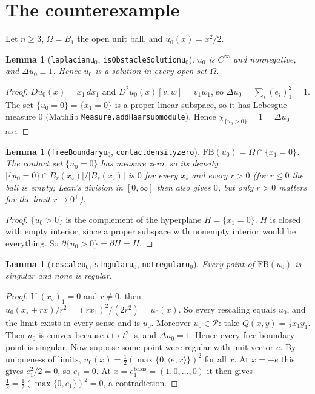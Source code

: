 \documentclass[11pt]{article}
\newtheorem{lemma}[theorem]{Lemma}
\theoremstyle{definition}
\theoremstyle{remark}
\renewcommand{\_}{\oldus\allowbreak}
\begin{document}
\section{The counterexample}

Let $n\ge 3$, $\Omega=B_1$ the open unit ball, and $u_0(x)=x_1^2/2$.

\begin{lemma}[\texttt{laplacian\_u$_0$}, \texttt{isObstacleSolution\_u$_0$}]
$u_0$ is $C^\infty$ and nonnegative, and $\Delta u_0\equiv 1$. Hence $u_0$ is a solution in every open set $\Omega$.
\end{lemma}
\begin{proof}
$Du_0(x)=x_1\,dx_1$ and $D^2u_0(x)[v,w]=v_1w_1$, so $\Delta u_0=\sum_i (e_i)_1^2=1$. The set
$\{u_0=0\}=\{x_1=0\}$ is a proper linear subspace, so it has Lebesgue measure $0$
(Mathlib \texttt{Measure.addHaar\_submodule}). Hence $\chi_{\{u_0>0\}}=1=\Delta u_0$ a.e.
\end{proof}

\begin{lemma}[\texttt{freeBoundary\_u$_0$}, \texttt{contact\_density\_zero}]
$\mathrm{FB}(u_0)=\Omega\cap\{x_1=0\}$. The contact set $\{u_0=0\}$ has measure zero, so its
density $|\{u_0=0\}\cap B_r(x_\circ)|/|B_r(x_\circ)|$ is $0$ for every $x_\circ$ and every $r>0$ (for $r\le0$ the ball is empty; Lean's division in $[0,\infty]$ then also gives $0$, but only $r>0$ matters for the limit $r\to0^+$).
\end{lemma}
\begin{proof}
$\{u_0>0\}$ is the complement of the hyperplane $H=\{x_1=0\}$. $H$ is closed with empty interior,
since a proper subspace with nonempty interior would be everything. So
$\partial\{u_0>0\}=\partial H=H$.
\end{proof}

\begin{lemma}[\texttt{rescale\_u$_0$}, \texttt{singular\_u$_0$}, \texttt{not\_regular\_u$_0$}]
Every point of $\mathrm{FB}(u_0)$ is singular and none is regular.
\end{lemma}
\begin{proof}
If $(x_\circ)_1=0$ and $r\neq0$, then $u_0(x_\circ+rx)/r^2=(rx_1)^2/(2r^2)=u_0(x)$. So every
rescaling equals $u_0$, and the limit exists in every sense and is $u_0$. Moreover $u_0\in\mathcal P$:
take $Q(x,y)=\frac12x_1y_1$. Then $u_0$ is convex because $t\mapsto t^2$ is, and $\Delta u_0=1$.
Hence every free-boundary point is singular. Now suppose some point were regular with unit vector
$e$. By uniqueness of limits, $u_0(x)=\frac12(\max\{0,\langle e,x\rangle\})^2$ for all $x$. At
$x=-e$ this gives $e_1^2/2=0$, so $e_1=0$. At $x=e_1^{\mathrm{basis}}=(1,0,\dots,0)$ it then
gives $\frac12=\frac12(\max\{0,e_1\})^2=0$, a contradiction.
\end{proof}
\end{document}
